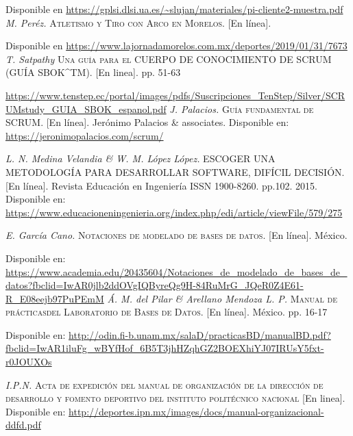 \begin{thebibliography}{}
	\linebreak
	Disponible en 
	\url{https://gplsi.dlsi.ua.es/~slujan/materiales/pi-cliente2-muestra.pdf}
	\textit{M. Peréz.}
	\textsc{Atletismo y Tiro con Arco en Morelos.} [En línea].
	
	\linebreak
	Disponible en 
	\url{https://www.lajornadamorelos.com.mx/deportes/2019/01/31/7673}
	\textit{T. Satpathy}
	\textsc{Una guía para el CUERPO DE CONOCIMIENTO DE SCRUM (GUÍA SBOK^{TM}).} [En linea]. pp. 51-63 
	
	\linebreak
	\url{https://www.tenstep.ec/portal/images/pdfs/Suscripciones_TenStep/Silver/SCRUMstudy_GUIA_SBOK_espanol.pdf}
	\textit{J. Palacios.}
	\textsc{Guía fundamental de SCRUM.} [En línea]. 
	Jerónimo Palacios \& associates. 
	\linebreak
	Disponible en: 
	\url{https://jeronimopalacios.com/scrum/}
	
	\textit{L. N. Medina Velandia \& W. M. López López.}
	\textsc{ESCOGER UNA METODOLOGÍA PARA DESARROLLAR SOFTWARE, DIFÍCIL DECISIÓN.} [En línea]. 
	Revista Educación en Ingeniería ISSN 1900-8260. pp.102. 2015. 
	\linebreak
	Disponible en: 
	\url{https://www.educacioneningenieria.org/index.php/edi/article/viewFile/579/275}
	
	\textit{E. García Cano.}
	\textsc{Notaciones de modelado de bases de datos.} [En línea]. México.
	
	\linebreak
	Disponible en:
	\url{https://www.academia.edu/20435604/Notaciones_de_modelado_de_bases_de_datos?fbclid=IwAR0jlb2ddOVgIQByreQg9H-84RuMrG_JQeR0Z4E61-R_E08eejb97PuPEmM}
	\textit{Á. M. del Pilar \& Arellano Mendoza L. P.}
	\textsc{Manual de prácticasdel Laboratorio de Bases de Datos.} [En línea]. México. pp. 16-17
	
	\linebreak
	Disponible en: 
	\url{http://odin.fi-b.unam.mx/salaD/practicasBD/manualBD.pdf?fbclid=IwAR1iluFg_wBYfHof_6B5T3jhHZqhGZ2BOEXhiYJ07IRUsY5fxt-r0JOUXOs}	
	
	\textit{I.P.N.}
	\textsc{Acta de expedición del manual de organización de la dirección de desarrollo y fomento deportivo del instituto politécnico nacional} [En linea].
	Disponible en:
	\url{http://deportes.ipn.mx/images/docs/manual-organizacional-ddfd.pdf}


\end{thebibliography}
